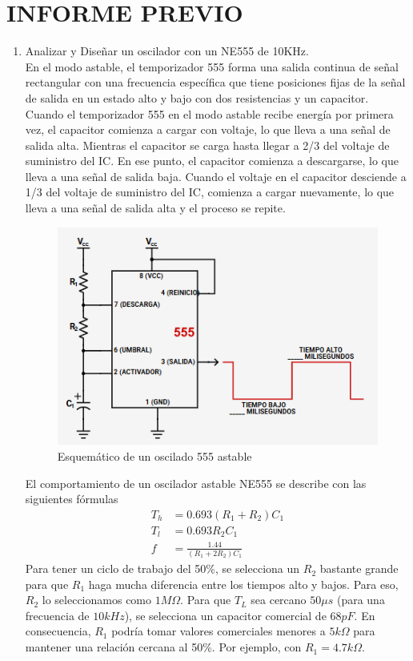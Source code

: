 \section{INFORME PREVIO}

\begin{enumerate}[label=\alph*)]
    \item Analizar y Diseñar un oscilador con un NE555 de 10KHz.\\
    En el modo astable, el temporizador 555 forma una salida continua de señal rectangular con una frecuencia específica que tiene posiciones fijas de la señal de salida en un estado alto y bajo con dos resistencias y un capacitor. Cuando el temporizador 555 en el modo astable recibe energía por primera vez, el capacitor comienza a cargar con voltaje, lo que lleva a una señal de salida alta. Mientras el capacitor se carga hasta llegar a 2/3 del voltaje de suministro del IC. En ese punto, el capacitor comienza a descargarse, lo que lleva a una señal de salida baja. Cuando el voltaje en el capacitor desciende a 1/3 del voltaje de suministro del IC, comienza a cargar nuevamente, lo que lleva a una señal de salida alta y el proceso se repite.\cite{NE555}
    \begin{figure}[H]
        \centering
        \includegraphics[width=.7\textwidth]{imgs/3.1. 555 Esquemático.png}
        \caption{Esquemático de un oscilado 555 astable}
    \end{figure}
    El comportamiento de un oscilador astable NE555 se describe con las siguientes fórmulas
    \begin{align*}
        T_h&=0.693(R_1+R_2)C_1\\
        T_l&=0.693R_2C_1\\
        f&=\frac{1.44}{(R_1+2R_2)C_1}
    \end{align*}
    Para tener un ciclo de trabajo del 50\%, se selecciona un $R_2$ bastante grande para que $R_1$ haga mucha diferencia entre los tiempos alto y bajos. Para eso, $R_2$ lo seleccionamos como $1M\Omega$. Para que $T_L$ sea cercano $50\mu s$ (para una frecuencia de $10kHz$), se selecciona un capacitor comercial de $68pF$. En consecuencia, $R_1$ podría tomar valores comerciales menores a $5k\Omega$ para mantener una relación cercana al 50\%. Por ejemplo, con $R_1=4.7k\Omega$.

\end{enumerate}
